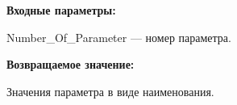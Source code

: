 \textbf{Входные параметры:}

Number\_Of\_Parameter --- номер параметра.

\textbf{Возвращаемое значение:}

Значения параметра в виде наименования.